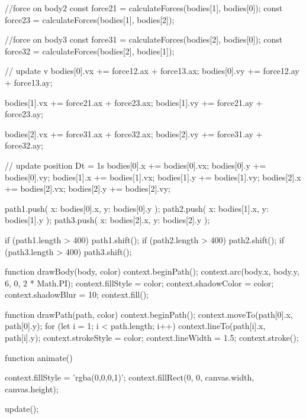 \documentclass[a4paper,12pt,twoside]{article}
\begin{document}
\begin{javascript}
{{{            //force on body2
            const force21 = calculateForces(bodies[1], bodies[0]);
            const force23 = calculateForces(bodies[1], bodies[2]);

            //force on body3
            const force31 = calculateForces(bodies[2], bodies[0]);
            const force32 = calculateForces(bodies[2], bodies[1]);

            // update v
            bodies[0].vx += force12.ax + force13.ax;
            bodies[0].vy += force12.ay + force13.ay;

            bodies[1].vx += force21.ax + force23.ax;
            bodies[1].vy += force21.ay + force23.ay;

            bodies[2].vx += force31.ax + force32.ax;
            bodies[2].vy += force31.ay + force32.ay;

            // update position Dt  = 1s
            bodies[0].x += bodies[0].vx;
            bodies[0].y += bodies[0].vy;
            bodies[1].x += bodies[1].vx;
            bodies[1].y += bodies[1].vy;
            bodies[2].x += bodies[2].vx;
            bodies[2].y += bodies[2].vy;

            path1.push({ x: bodies[0].x, y: bodies[0].y });
            path2.push({ x: bodies[1].x, y: bodies[1].y });
            path3.push({ x: bodies[2].x, y: bodies[2].y });

            if (path1.length > 400) path1.shift();
            if (path2.length > 400) path2.shift();
            if (path3.length > 400) path3.shift();
        }

        function drawBody(body, color) {
            context.beginPath();
            context.arc(body.x, body.y, 6, 0, 2 * Math.PI);
            context.fillStyle = color;
            context.shadowColor = color;
            context.shadowBlur = 10;
            context.fill();
        }

        function drawPath(path, color) {
            context.beginPath();
            context.moveTo(path[0].x, path[0].y);
            for (let i = 1; i < path.length; i++) {
                context.lineTo(path[i].x, path[i].y);
            }
            context.strokeStyle = color;
            context.lineWidth = 1.5;
            context.stroke();
        }

        function animate() {
            context.fillStyle = 'rgba(0,0,0,1)';
            context.fillRect(0, 0, canvas.width, canvas.height);

            update();

}}}
\end{javascript}
\end{document}
